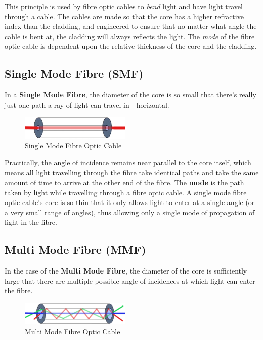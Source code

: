 This principle is used by fibre optic cables to \textit{bend} light and have light travel through a cable. The cables are made so that the core has a higher refractive index than the cladding, and engineered to ensure that no matter what angle the cable is bent at, the cladding will always reflects the light. The \textit{mode} of the fibre optic cable is dependent upon the relative thickness of the core and the cladding. 

\subsection{Single Mode Fibre (SMF)}
In a \textbf{Single Mode Fibre}, the diameter of the core is so small that there's really just one path a ray of light can travel in - horizontal.

\begin{figure}
	\centering
	\vspace{-12pt}
	\includegraphics[width=0.47\textwidth]{"Mod1/chapters/1.4.d SingleMode Fibre"}
	\caption{\label{fig:sm_fibre}Single Mode Fibre Optic Cable}
	\vspace{-10pt}
\end{figure}

\noindent
Practically, the angle of incidence remains near parallel to the core itself, which means all light travelling through the fibre take identical paths and take the same amount of time to arrive at the other end of the fibre. The \textbf{mode} is the path taken by light while travelling through a fibre optic cable. A single mode fibre optic cable's core is so thin that it only allows light to enter at a single angle (or a very small range of angles), thus allowing only a single mode of propagation of light in the fibre. 

\subsection{Multi Mode Fibre (MMF)} \label{sec:mmf}
In the case of the \textbf{Multi Mode Fibre}, the diameter of the core is sufficiently large that there are multiple possible angle of incidences at which light can enter the fibre. 
\begin{figure}
	\centering
	\vspace{-12pt}
	\includegraphics[width=0.47\textwidth]{"Mod1/chapters/1.4.e MultiMode Fibre"}
	\caption{\label{fig:mm_fibre}Multi Mode Fibre Optic Cable}
	\vspace{-10pt}
\end{figure}

